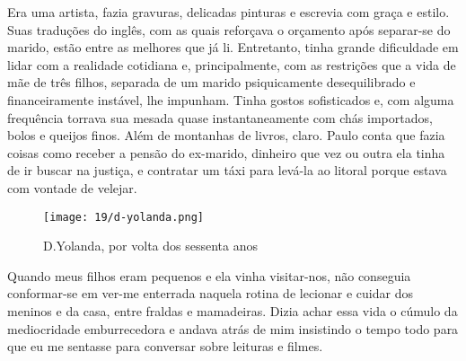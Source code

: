 Era uma artista, fazia gravuras, delicadas pinturas e escrevia com graça e estilo.
 Suas traduções do inglês, com as quais reforçava o orçamento após separar-se do marido, estão entre as melhores que já li.
Entretanto, tinha grande dificuldade em lidar com a realidade cotidiana e, principalmente, com as restrições que a vida de mãe de três filhos, separada de um marido psiquicamente desequilibrado e financeiramente instável, lhe impunham.
Tinha gostos sofisticados e, com alguma frequência torrava sua mesada quase instantaneamente com chás importados, bolos e queijos finos.
Além de montanhas de livros, claro.
Paulo conta que fazia coisas como receber a pensão do ex-marido, dinheiro que vez ou outra ela tinha de ir buscar na justiça, e contratar um táxi para levá-la ao litoral porque estava com vontade de velejar.
 

\begin{figure}
\centering
\texttt{[image: 19/d-yolanda.png]}
\caption{D.Yolanda, por volta dos sessenta anos}
\end{figure}

Quando meus filhos eram pequenos e ela vinha visitar-nos, não conseguia conformar-se em ver-me enterrada naquela rotina de lecionar e cuidar dos meninos e da casa, entre fraldas e mamadeiras.
Dizia achar essa vida o cúmulo da mediocridade emburrecedora e andava atrás de mim insistindo o tempo todo para que eu me sentasse para conversar sobre leituras e filmes.


